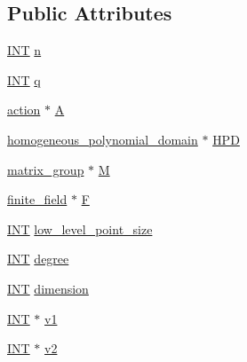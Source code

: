 \subsection*{Public Attributes}
\begin{DoxyCompactItemize}
\item 
\mbox{\hyperlink{galois_8h_a09fddde158a3a20bd2dcadb609de11dc}{I\+NT}} \mbox{\hyperlink{classaction__on__homogeneous__polynomials_a1fa5aeaaf53e9e4f470360d0321e19cd}{n}}
\item 
\mbox{\hyperlink{galois_8h_a09fddde158a3a20bd2dcadb609de11dc}{I\+NT}} \mbox{\hyperlink{classaction__on__homogeneous__polynomials_a04d9a128b4e4a2d732f01d8fd4dbbc0d}{q}}
\item 
\mbox{\hyperlink{classaction}{action}} $\ast$ \mbox{\hyperlink{classaction__on__homogeneous__polynomials_a5bfe42cc79e244bdad9493240bdae3ef}{A}}
\item 
\mbox{\hyperlink{classhomogeneous__polynomial__domain}{homogeneous\+\_\+polynomial\+\_\+domain}} $\ast$ \mbox{\hyperlink{classaction__on__homogeneous__polynomials_a500d36c65db821772b06e195374e9eb3}{H\+PD}}
\item 
\mbox{\hyperlink{classmatrix__group}{matrix\+\_\+group}} $\ast$ \mbox{\hyperlink{classaction__on__homogeneous__polynomials_a7e09361c47b750fc47a2f5bf85bcb925}{M}}
\item 
\mbox{\hyperlink{classfinite__field}{finite\+\_\+field}} $\ast$ \mbox{\hyperlink{classaction__on__homogeneous__polynomials_a7ab0a325571396e674c14e3362df4093}{F}}
\item 
\mbox{\hyperlink{galois_8h_a09fddde158a3a20bd2dcadb609de11dc}{I\+NT}} \mbox{\hyperlink{classaction__on__homogeneous__polynomials_a6473db2d876d1f939c28e21b8ba5e6a4}{low\+\_\+level\+\_\+point\+\_\+size}}
\item 
\mbox{\hyperlink{galois_8h_a09fddde158a3a20bd2dcadb609de11dc}{I\+NT}} \mbox{\hyperlink{classaction__on__homogeneous__polynomials_a25f8cda235c36d256f8a37f754e2f428}{degree}}
\item 
\mbox{\hyperlink{galois_8h_a09fddde158a3a20bd2dcadb609de11dc}{I\+NT}} \mbox{\hyperlink{classaction__on__homogeneous__polynomials_a65ea698255c4a442d597e3af10ddfa45}{dimension}}
\item 
\mbox{\hyperlink{galois_8h_a09fddde158a3a20bd2dcadb609de11dc}{I\+NT}} $\ast$ \mbox{\hyperlink{classaction__on__homogeneous__polynomials_a6a992499b2d57e8bbab40437df4af43e}{v1}}
\item 
\mbox{\hyperlink{galois_8h_a09fddde158a3a20bd2dcadb609de11dc}{I\+NT}} $\ast$ \mbox{\hyperlink{classaction__on__homogeneous__polynomials_a7e128b7c55e7a71f9fa94fc29fa7b203}{v2}}

\end{DoxyCompactItemize}
